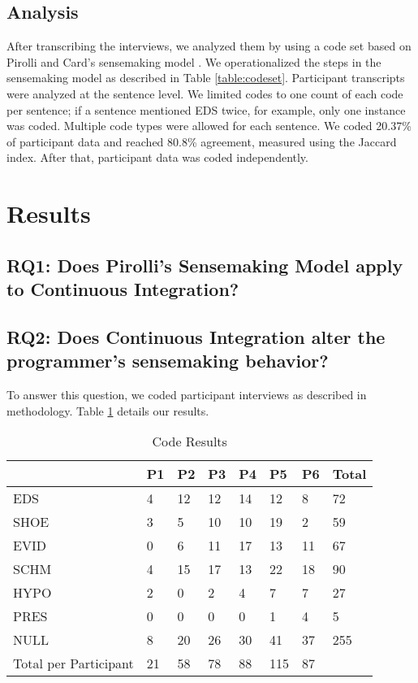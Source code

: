 \documentclass{sig-alternate}
\begin{document}
\subsection{Analysis}
After transcribing the interviews, we analyzed them by using a code set based on Pirolli and Card's sensemaking model \cite{pirolli:sensemaking}. We operationalized the steps in the sensemaking model as described in Table \ref{table:codeset}. Participant transcripts were analyzed at the sentence level. We limited codes to one count of each code per sentence; if a sentence mentioned EDS twice, for example, only one instance was coded. Multiple code types were allowed for each sentence. We coded 20.37\% of participant data and reached 80.8\% agreement, measured using the Jaccard index. After that, participant data was coded independently.

\section{Results}

\subsection{RQ1:  Does Pirolli's Sensemaking Model apply to Continuous Integration?}
\subsection{RQ2: Does Continuous Integration alter the programmer's sensemaking behavior?}
To answer this question, we coded participant interviews as described in methodology. Table \ref{table:coderesults} details our results. 
\begin{table}
\centering
\caption{Code Results}
\label{table:coderesults}
\begin{tabular}{ | p{} | l | l | l | l | l | l | l | }
	\hline
	& P1 & P2 & P3 & P4 & P5 & P6 & Total \\ \hline
	EDS & 4 & 12 & 12 & 14 & 12 & 8 & 72 \\ \hline
	SHOE & 3 & 5 & 10 & 10 & 19 & 2 & 59 \\ \hline
	EVID & 0 & 6 & 11 & 17 & 13 & 11 & 67 \\ \hline
	SCHM & 4 & 15 & 17 & 13 & 22 & 18 & 90 \\ \hline
	HYPO & 2 & 0 & 2 & 4 & 7 & 7 & 27 \\ \hline
	PRES & 0 & 0 & 0 & 0 & 1 & 4 & 5 \\ \hline
	NULL & 8 & 20 & 26 & 30 & 41 & 37 & 255 \\ \hline
	Total per Participant & 21 & 58 & 78 & 88 & 115 & 87 &  \\ \hline
\end{tabular}
\end{table}
\end{document}
